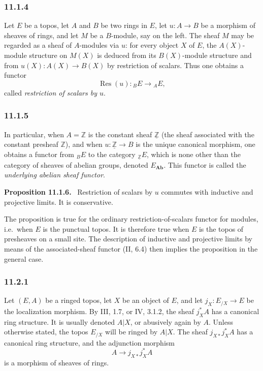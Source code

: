 \documentclass[11pt]{article}
\newcommand{\ZZ}{\mathbb{Z}}
\newcommand{\Ab}{\mathbf{Ab}}
\newcommand{\Res}{\operatorname{Res}}
\newcommand{\ie}{i.e.}
\newenvironment{statement}[1]{\par\medskip\noindent\textbf{#1.}\ }{\par\medskip}
\begin{document}
\subsubsection*{11.1.4}
Let $E$ be a topos, let $A$ and $B$ be two rings in $E$, let $u:A\to B$ be a morphism of sheaves of rings, and let $M$ be a $B$-module, say on the left. The sheaf $M$ may be regarded as a sheaf of $A$-modules via $u$: for every object $X$ of $E$, the $A(X)$-module structure on $M(X)$ is deduced from its $B(X)$-module structure and from $u(X):A(X)\to B(X)$ by restriction of scalars. Thus one obtains a functor
\[
\Res(u):{}_BE\longrightarrow {}_AE,
\]
called \emph{restriction of scalars by $u$}.

\subsubsection*{11.1.5}
In particular, when $A=\ZZ$ is the constant sheaf $\underline{\ZZ}$ (the sheaf associated with the constant presheaf $\ZZ$), and when $u:\underline{\ZZ}\to B$ is the unique canonical morphism, one obtains a functor from ${}_BE$ to the category ${}_{\underline{\ZZ}}E$, which is none other than the category of sheaves of abelian groups, denoted $E_{\Ab}$. This functor is called the \emph{underlying abelian sheaf functor}.

\begin{statement}{Proposition 11.1.6}
Restriction of scalars by $u$ commutes with inductive and projective limits. It is conservative.
\end{statement}

The proposition is true for the ordinary restriction-of-scalars functor for modules, \ie\ when $E$ is the punctual topos. It is therefore true when $E$ is the topos of presheaves on a small site. The description of inductive and projective limits by means of the associated-sheaf functor (II, 6.4) then implies the proposition in the general case.

\subsubsection*{11.2.1}
Let $(E,A)$ be a ringed topos, let $X$ be an object of $E$, and let $j_X:E_{/X}\to E$ be the localization morphism. By III, 1.7, or IV, 3.1.2, the sheaf $j_X^*A$ has a canonical ring structure. It is usually denoted $A|X$, or abusively again by $A$. Unless otherwise stated, the topos $E_{/X}$ will be ringed by $A|X$. The sheaf $j_{X*}j_X^*A$ has a canonical ring structure, and the adjunction morphism
\[
A\longrightarrow j_{X*}j_X^*A
\]
is a morphism of sheaves of rings.
\end{document}
